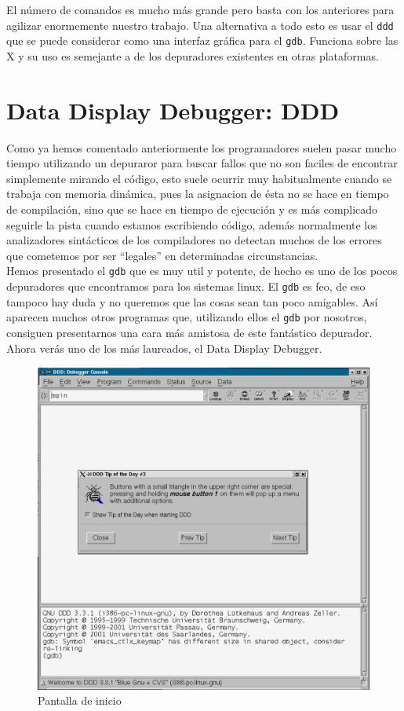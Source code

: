 El  número  de  comandos  es  mucho más  grande  pero  basta  con  los
anteriores para agilizar enormemente  nuestro trabajo. Una alternativa
a todo  esto es  usar el {\tt  ddd} que se  puede considerar  como una
interfaz gráfica  para el {\tt gdb}.  Funciona sobre las {\sf  X} y su
uso es semejante a de los depuradores existentes en otras plataformas.

\section{Data Display Debugger: DDD}

Como ya  hemos comentado anteriormente los  programadores suelen pasar
mucho tiempo utilizando un depuraror  para buscar fallos que no son
faciles de encontrar simplemente mirando el código, esto suele ocurrir
muy  habitualmente cuando  se trabaja  con memoria  dinámica, pues  la
asignacion de  ésta no se hace  en tiempo de compilación,  sino que se
hace en  tiempo de  ejecución y  es más  complicado seguirle  la pista
cuando estamos escribiendo código, además normalmente los analizadores
sintácticos de los compiladores no  detectan muchos de los errores que
cometemos por ser ``legales'' en determinadas circunstancias.\\

Hemos presentado el {\tt  gdb} que es muy util y  potente, de hecho es
uno de los pocos depuradores  que encontramos para los sistemas linux.
El  {\tt  gdb}  es  feo,  de  eso  tampoco  hay  duda  y  no  queremos
que  las cosas  sean tan  poco  amigables. Así  aparecen muchos  otros
programas que, utilizando  ellos el {\tt gdb}  por nosotros, consiguen
presentarnos una cara más amistosa de este fantástico depurador. Ahora
verás uno de los más laureados, el {\sf Data Display Debugger}.

\begin{figure}[hbtp]
\centering
\includegraphics[width=\textwidth]{imagenes/ddd_inicio.eps}
\caption{Pantalla de inicio}
\end{figure}

